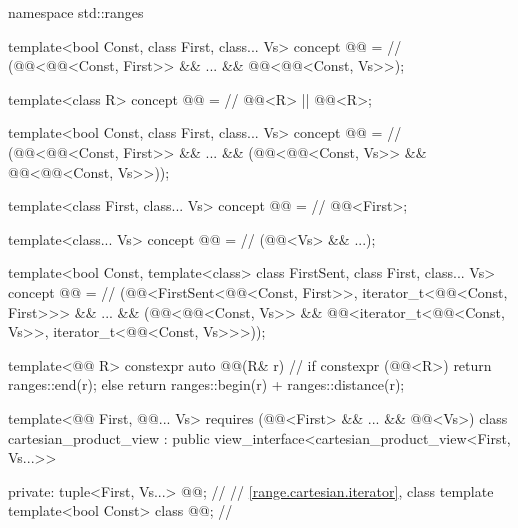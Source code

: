 \begin{codeblock}
namespace std::ranges {
  template<bool Const, class First, class... Vs>
  concept @@ =          // \expos
    (@@<@@<Const, First>> && ... &&
      @@<@@<Const, Vs>>);

  template<class R>
  concept @@ =                // \expos
    @@<R> || @@<R>;

  template<bool Const, class First, class... Vs>
  concept @@ =          // \expos
    (@@<@@<Const, First>> && ... &&
      (@@<@@<Const, Vs>>
        && @@<@@<Const, Vs>>));

  template<class First, class... Vs>
  concept @@ =                 // \expos
    @@<First>;

  template<class... Vs>
  concept @@ =                  // \expos
    (@@<Vs> && ...);

  template<bool Const, template<class> class FirstSent, class First, class... Vs>
    concept @@ =               // \expos
      (@@<FirstSent<@@<Const, First>>,
          iterator_t<@@<Const, First>>> && ...
        && (@@<@@<Const, Vs>>
          && @@<iterator_t<@@<Const, Vs>>,
              iterator_t<@@<Const, Vs>>>));

  template<@@ R>
  constexpr auto @@(R& r) {       // \expos
    if constexpr (@@<R>) {
      return ranges::end(r);
    } else {
      return ranges::begin(r) + ranges::distance(r);
    }
  }

  template<@@ First, @@... Vs>
    requires (@@<First> && ... && @@<Vs>)
  class cartesian_product_view : public view_interface<cartesian_product_view<First, Vs...>> {
  private:
    tuple<First, Vs...> @@;                 // \expos
    // \ref{range.cartesian.iterator}, class template 
    template<bool Const> class @@;       // \expos

}}
\end{codeblock}
